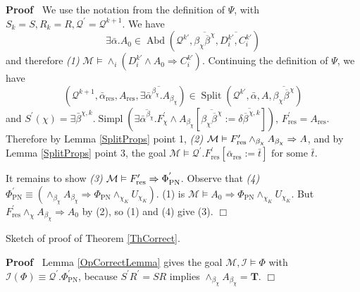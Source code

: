\documentclass{article}
\newcommand{\assign}{:=}
\newcommand{\tmem}[1]{{\em #1\/}}
\newcommand{\tmmathbf}[1]{\ensuremath{\boldsymbol{#1}}}
\newcommand{\tmop}[1]{\ensuremath{\operatorname{#1}}}
\newenvironment{proof}{\noindent\textbf{Proof\ }}{\hspace*{\fill}$\Box$\medskip}
\begin{document}
\begin{proof}
  We use the notation from the definition of $\Psi$, with $S_k = S, R_k = R,
  \mathcal{Q}^{\prime} =\mathcal{Q}^{k + 1}$. We have
  \[ \exists \bar{\alpha} .A_0 \in \tmop{Abd} \left( \mathcal{Q}^{k\prime},
     \overline{\beta_{\chi} \overline{\beta^{}}^{\chi}},
     \overline{D_i^{k\prime}, C_i^{k\prime}} \right) \]
  and therefore {\tmem{(1)}} $\mathcal{M} \vDash \wedge_i (D_i^{k\prime}
  \wedge A_0 \Rightarrow C_i^{k\prime})$. Continuing the definition of $\Psi$,
  we have
  \[ \left( \mathcal{Q}^{k + 1}, \bar{\alpha}_{\tmop{res}}, A_{\tmop{res}},
     \overline{\exists \bar{\alpha}^{\beta_{\chi}} .A_{\beta_{\chi}}} \right)
     \in \tmop{Split} \left( \mathcal{Q}^{k\prime}, \bar{\alpha}, A,
     \overline{\beta_{\chi} \overline{\beta^{}}^{\chi}} \right) \]
  and $S^{\prime} (\chi) = \exists \bar{\beta}^{\chi, k} . \tmop{Simpl} \left(
  \exists \overline{\bar{\alpha}^{\beta_{\chi}}} .F_{\chi}^{\prime} \wedge
  A_{\beta_{\chi}} \left[ \overline{\beta_{\chi} \overline{\beta^{}}^{\chi}}
  \assign \overline{\delta \overline{\beta^{}}^{\chi, k}} \right] \right)$,
  $F_{\tmop{res}}^{\prime} = A_{\tmop{res}}$. Therefore by Lemma
  \ref{SplitProps} point 1, {\tmem{(2)}} $\mathcal{M} \vDash
  F_{\tmop{res}}^{\prime} \wedge_{\beta_{\chi}} A_{\beta_{\chi}} \Rightarrow
  {\nobreak} A$, and by Lemma \ref{SplitProps} point 3, the goal $\mathcal{M}
  \vDash \mathcal{Q}^{\prime} .F_{\tmop{res}}^{\prime}
  [\bar{\alpha}_{\tmop{res}} \assign \bar{t}] \text{ \ for some } \bar{t}$.
  
  It remains to show {\tmem{(3)}} $\mathcal{M} \vDash F_{\tmop{res}}^{\prime}
  \Rightarrow {\nobreak} \Phi_{\tmop{PN}}^{^{\prime}}$. Observe that
  {\tmem{(4)}} $\Phi^{\prime}_{\tmop{PN}} \equiv (\wedge_{\beta_{\chi}}
  A_{\beta_{\chi}} \Rightarrow \Phi_{\tmop{PN}} \wedge_{\chi_K} U_{\chi_K})$.
  (1) is $\mathcal{M} \vDash A_0 \Rightarrow \Phi_{\tmop{PN}} \wedge_{\chi_K}
  U_{\chi_K}$. But $F^{\prime}_{\tmop{res}} \wedge_{\chi} A_{\beta_{\chi}}
  \Rightarrow A_0$ by (2), so (1) and (4) give (3).
\end{proof}

Sketch of proof of Theorem \ref{ThCorrect}.

\begin{proof}
  Lemma \ref{OpCorrectLemma} gives the goal $\mathcal{M}, \mathcal{I} \vDash
  \Phi$ with \ $\mathcal{I} (\Phi) \equiv \mathcal{Q}^{\prime} .
  \Phi_{\tmop{PN}}^{\prime}$, because $S^{\prime} R^{\prime} = SR$ implies
  $\wedge_{\beta_{\chi}} A_{\beta_{\chi}} =\tmmathbf{T}$.
\end{proof}
\end{document}
